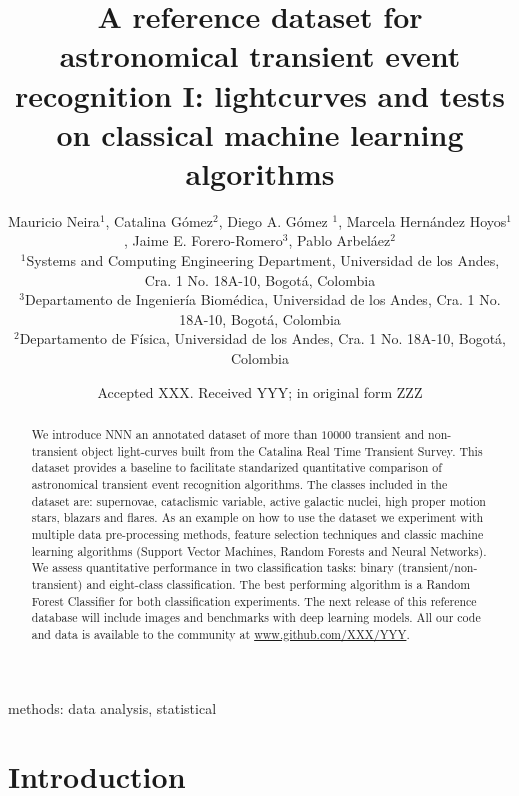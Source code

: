 \documentclass[a4paper,fleqn,usenatbib]{mnras}
\title[A reference transient dataset I: lightcurves]{A reference
  dataset for astronomical transient event recognition I: lightcurves
  and tests on classical machine learning algorithms}
\author[M. Neira et al.]
{Mauricio Neira$^{1}$, Catalina G\'omez$^{2}$, Diego A. G\'omez $^{1}$,
Marcela Hern\'andez Hoyos$^{1}$,   
\newauthor
Jaime E. Forero-Romero$^{3}$,
Pablo Arbel\'aez$^{2}$
\\
$^{1}$Systems and Computing Engineering Department, Universidad de los Andes, Cra. 1 No. 18A-10, Bogot\'a, Colombia\\
$^{3}$Departamento de Ingenier\'ia Biom\'edica, Universidad de los Andes, Cra. 1 No. 18A-10, Bogot\'a, Colombia\\
$^{2}$Departamento de F\'isica, Universidad de los Andes, Cra. 1 No. 18A-10, Bogot\'a, Colombia
}
\date{Accepted XXX. Received YYY; in original form ZZZ}
\begin{document}
\label{firstpage}
\pagerange{\pageref{firstpage}--\pageref{lastpage}}
\maketitle

\begin{abstract}

We introduce NNN an annotated dataset of more than $10000$ transient and
non-transient object light-curves built from the Catalina Real Time
Transient Survey.
This dataset provides a baseline to facilitate standarized
quantitative comparison of astronomical transient event recognition
algorithms.    
The classes included in the dataset are: supernovae, cataclismic
variable, active galactic nuclei, high proper motion stars, blazars
and flares.
As an example on how to use the dataset we experiment with multiple
data pre-processing methods, feature selection techniques and classic
machine learning algorithms (Support Vector Machines, Random Forests
and Neural Networks).   
We assess quantitative performance in two classification tasks:
binary (transient/non-transient) and eight-class classification.   
The best performing algorithm is a Random Forest Classifier for both
classification experiments.  
The next release of this reference database will include images and
benchmarks with deep learning models.
All our code and data is available to the community at
\url{www.github.com/XXX/YYY}.
\end{abstract}

\begin{keywords}
methods: data analysis, statistical
\end{keywords}



\section{Introduction}
\end{document}

